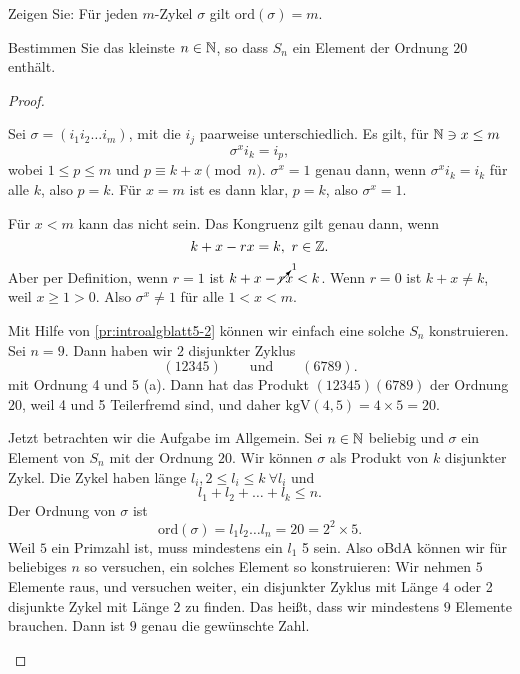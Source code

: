 \begin{Problem}
	\begin{parts}
	\item Zeigen Sie: F\"{u}r jeden $m$-Zykel $\sigma$ gilt $\text{ord}(\sigma)=m$.
	\item Bestimmen Sie das kleinste $n\in \mathbb{N}$, so dass $S_n$ ein Element der Ordnung $20$ enthält.
	\end{parts}
\end{Problem}
\begin{proof}
	\begin{parts}
	\item Sei $\sigma=(i_1i_2\dots i_m)$, mit die $i_j$ paarweise unterschiedlich. Es gilt, f\"{u}r $\mathbb{N}\ni x\le m$
		\[
		\sigma^x i_k=i_p
		,\] 
		wobei $1\le p \le m$ und $p\equiv k+x\pmod{n}$. $\sigma^x=1$ genau dann, wenn $\sigma^x i_k=i_k$ f\"{u}r alle $k$, also $p=k$. F\"{u}r $x=m$ ist es dann klar, $p=k$, also $\sigma^x=1$. 

		F\"{u}r $x < m$ kann das nicht sein. Das Kongruenz gilt genau dann, wenn
		\[
		k+x-rx=k,~r\in \mathbb{Z}
		.\] 
		Aber per Definition, wenn $r=1$ ist $k+x-\cancelto{1}{r}x<k$. Wenn $r=0$ ist $k+x\neq k$, weil $x\ge 1>0$. Also $\sigma^x\neq 1$ f\"{u}r alle $1 < x < m$.
	\item Mit Hilfe von \ref{pr:introalgblatt5-2} können wir einfach eine solche $S_n$ konstruieren. Sei $n=9$. Dann haben wir $2$ disjunkter Zyklus
		\[
			(12345)\qquad\text{und}\qquad(6789)
		.\] 
		mit Ordnung 4 und 5 (a). Dann hat das Produkt $(12345)(6789)$ der Ordnung $20$, weil 4 und 5 Teilerfremd sind, und daher $\text{kgV}(4,5)=4\times 5=20$.

		Jetzt betrachten wir die Aufgabe im Allgemein. Sei $n\in \mathbb{N}$ beliebig und $\sigma$ ein Element von $S_n$ mit der Ordnung $20$. Wir können $\sigma$ als Produkt von $k$ disjunkter Zykel. Die Zykel haben länge $l_i, 2\le l_i \le k~\forall l_i$ und
		\[
		l_1+l_2+\dots+l_k\le n
		.\] 
		Der Ordnung von $\sigma$ ist
		\[
			\text{ord}(\sigma)=l_1l_2\dots l_n=20=2^2\times 5
		.\] 
		Weil $5$ ein Primzahl ist, muss mindestens ein $l_1$ 5 sein. Also oBdA können wir f\"{u}r beliebiges $n$ so versuchen, ein solches Element so konstruieren: Wir nehmen $5$ Elemente raus, und versuchen weiter, ein disjunkter Zyklus mit Länge $4$ oder 2 disjunkte Zykel mit Länge $2$ zu finden. Das heißt, dass wir mindestens $9$ Elemente brauchen. Dann ist $9$ genau die gewünschte Zahl.\qedhere
	\end{parts}
\end{proof}

